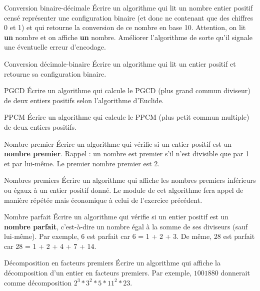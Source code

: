 \begin{Exercice}{Conversion binaire-décimale}
	Écrire un algorithme qui lit un nombre entier positif censé représenter
	une configuration binaire (et donc ne contenant que des chiffres 0 et
	1) et qui retourne la conversion de ce nombre en base 10. Attention, on
	lit \textbf{un} nombre et on affiche \textbf{un} nombre. Améliorer
	l’algorithme de sorte qu’il signale une éventuelle erreur d’encodage.
\end{Exercice}

\begin{Exercice}{Conversion décimale-binaire}
	Écrire un algorithme qui lit un entier positif et retourne sa
	configuration binaire.
\end{Exercice}

\begin{Exercice}{PGCD}
	Écrire un algorithme qui calcule le PGCD (plus grand commun diviseur) de
	deux entiers positifs selon l’algorithme d’Euclide.
\end{Exercice}

\begin{Exercice}{PPCM}
	Écrire un algorithme qui calcule le PPCM (plus petit commun multiple) de
	deux entiers positifs.
\end{Exercice}

\begin{Exercice}{Nombre premier}
	Écrire un algorithme qui vérifie si un entier positif est un
	\textbf{nombre premier}. 
	Rappel : un nombre est premier s’il n’est divisible que par 1 et par
	lui-même. Le premier nombre premier est 2.
\end{Exercice}

\begin{Exercice}{Nombres premiers}
	Écrire un algorithme qui affiche les nombres premiers inférieurs ou
	égaux à un entier positif donné. Le module de cet algorithme fera appel
	de manière répétée mais économique à celui de l’exercice précédent.
\end{Exercice}

\begin{Exercice}{Nombre parfait}
	Écrire un algorithme qui vérifie si un entier positif est un
	\textbf{nombre parfait}, c’est-à-dire un nombre égal à la somme de ses
	diviseurs (sauf lui-même). Par exemple, 6 est parfait car 6 = 1 + 2 +
	3. De même, 28 est parfait car 28 = 1 + 2 + 4 + 7 + 14.
\end{Exercice}

\begin{Exercice}{Décomposition en facteurs premiers}
	Écrire un algorithme qui affiche la décomposition 
	d’un entier en facteurs premiers. 
	Par exemple, $1001880$ donnerait comme décomposition
	$2^3 * 3^2 * 5 * 11^2 * 23$.
\end{Exercice}

